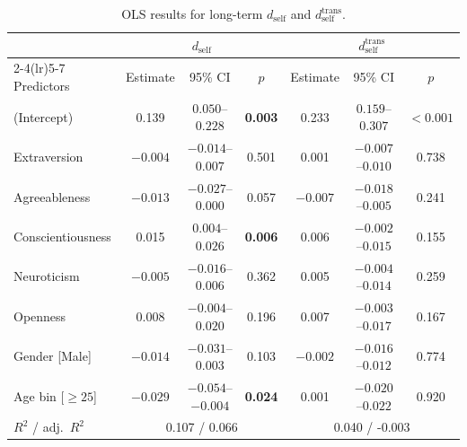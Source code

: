 \begin{table}[htbp]
\centering
\caption{OLS results for long-term $d_{\text{self}}$ and $d_{\text{self}}^{\text{trans}}$.}
\label{tab:ols_signature_long}
\begin{tabular}{lcccccc}
\toprule
& \multicolumn{3}{c}{$d_{\text{self}}$} & \multicolumn{3}{c}{$d_{\text{self}}^{\text{trans}}$} \\
\cmidrule(lr){2-4}\cmidrule(lr){5-7}
Predictors & Estimate & 95\% CI & $p$ & Estimate & 95\% CI & $p$ \\
\midrule
(Intercept)            & 0.139   & $0.050$--$0.228$    & \textbf{0.003} & 0.233    & $0.159$--$0.307$    & \textbf{$<0.001$} \\
Extraversion           & $-0.004$& $-0.014$--$0.007$   & 0.501          & 0.001    & $-0.007$--$0.010$   & 0.738 \\
Agreeableness          & $-0.013$& $-0.027$--$0.000$   & 0.057          & $-0.007$ & $-0.018$--$0.005$   & 0.241 \\
Conscientiousness      & 0.015   & $0.004$--$0.026$    & \textbf{0.006} & 0.006    & $-0.002$--$0.015$   & 0.155 \\
Neuroticism            & $-0.005$& $-0.016$--$0.006$   & 0.362          & 0.005    & $-0.004$--$0.014$   & 0.259 \\
Openness               & 0.008   & $-0.004$--$0.020$   & 0.196          & 0.007    & $-0.003$--$0.017$   & 0.167 \\
Gender [Male]          & $-0.014$& $-0.031$--$0.003$   & 0.103          & $-0.002$ & $-0.016$--$0.012$   & 0.774 \\
Age bin [$\ge 25$]     & $-0.029$& $-0.054$--$-0.004$  & \textbf{0.024} & 0.001    & $-0.020$--$0.022$   & 0.920 \\
\midrule
$R^2$ / adj.\ $R^2$    & \multicolumn{3}{c}{0.107 / 0.066} & \multicolumn{3}{c}{0.040 / -0.003} \\
\bottomrule
\end{tabular}
\end{table}